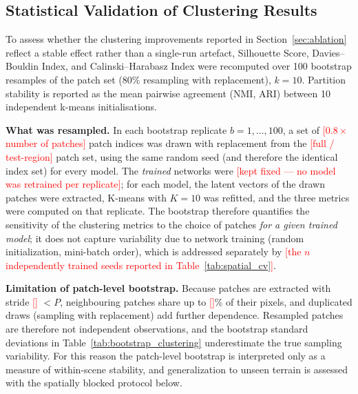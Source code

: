 \documentclass[pdflatex,sn-mathphys-num]{sn-jnl}
\newcommand{\fillin}[1]{\textcolor{red}{[#1]}}
\begin{document}
\subsection{Statistical Validation of Clustering Results}
\label{sec:stats}

To assess whether the clustering improvements reported in
Section~\ref{sec:ablation} reflect a stable effect rather than a
single-run artefact, Silhouette Score, Davies--Bouldin Index, and
Calinski--Harabasz Index were recomputed over 100 bootstrap
resamples of the patch set (80\% resampling with replacement),
$k=10$. Partition stability is reported as the mean pairwise
agreement (NMI, ARI) between 10 independent k-means initialisations.

\textbf{What was resampled.} In each bootstrap replicate $b=1,\ldots,100$, a set of \fillin{$0.8\times$ number of patches} patch indices was drawn with replacement from the \fillin{full / test-region} patch set, using the same random seed (and therefore the identical index set) for every model. The \emph{trained} networks were \fillin{kept fixed --- no model was retrained per replicate}; for each model, the latent vectors of the drawn patches were extracted, K-means with $K=10$ was refitted, and the three metrics were computed on that replicate. The bootstrap therefore quantifies the sensitivity of the clustering metrics to the choice of patches \emph{for a given trained model}; it does not capture variability due to network training (random initialization, mini-batch order), which is addressed separately by \fillin{the $n$ independently trained seeds reported in Table~\ref{tab:spatial_cv}}.

\textbf{Limitation of patch-level bootstrap.} Because patches are extracted with stride \fillin{} $<P$, neighbouring patches share up to \fillin{}\% of their pixels, and duplicated draws (sampling with replacement) add further dependence. Resampled patches are therefore not independent observations, and the bootstrap standard deviations in Table~\ref{tab:bootstrap_clustering} underestimate the true sampling variability. For this reason the patch-level bootstrap is interpreted only as a measure of within-scene stability, and generalization to unseen terrain is assessed with the spatially blocked protocol below.
\end{document}

